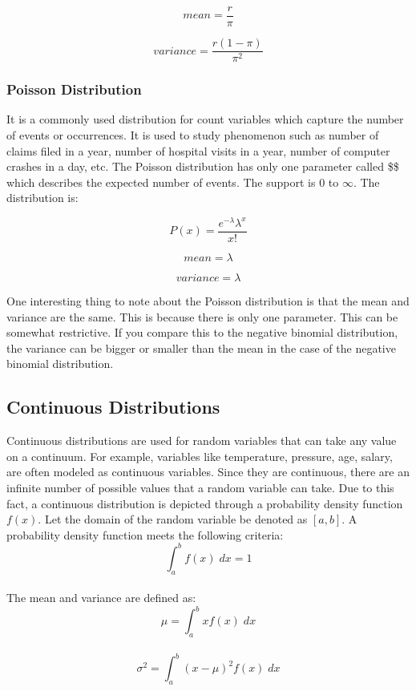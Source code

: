 \documentclass[
]{article}
\begin{document}
\[mean = \frac{r}{\pi}\]

\[variance = \frac{r(1-\pi)}{\pi^2}\]

\hypertarget{poisson-distribution}{%
\subsubsection{Poisson Distribution}\label{poisson-distribution}}

It is a commonly used distribution for count variables which capture the
number of events or occurrences. It is used to study phenomenon such as
number of claims filed in a year, number of hospital visits in a year,
number of computer crashes in a day, etc. The Poisson distribution has
only one parameter called \$\lambda\$ which describes the expected
number of events. The support is 0 to \(\infty\). The distribution is:

\[P(x) = \frac{e^{-\lambda}\lambda^x}{x!}\]

\[mean = \lambda\]

\[variance = \lambda\]

One interesting thing to note about the Poisson distribution is that the
mean and variance are the same. This is because there is only one
parameter. This can be somewhat restrictive. If you compare this to the
negative binomial distribution, the variance can be bigger or smaller
than the mean in the case of the negative binomial distribution.

\hypertarget{continuous-distributions}{%
\subsection{Continuous Distributions}\label{continuous-distributions}}

Continuous distributions are used for random variables that can take any
value on a continuum. For example, variables like temperature, pressure,
age, salary, are often modeled as continuous variables. Since they are
continuous, there are an infinite number of possible values that a
random variable can take. Due to this fact, a continuous distribution is
depicted through a probability density function \(f(x)\). Let the domain
of the random variable be denoted as \([a,b]\). A probability density
function meets the following criteria:\\
\[\int_{a}^{b} f(x) \; dx = 1\]\\
The mean and variance are defined as:\\
\[\mu = \int_{a}^{b} xf(x) \; dx\]\\
\[\sigma^2 = \int_{a}^{b} (x-\mu)^2f(x) \; dx\]
\end{document}
